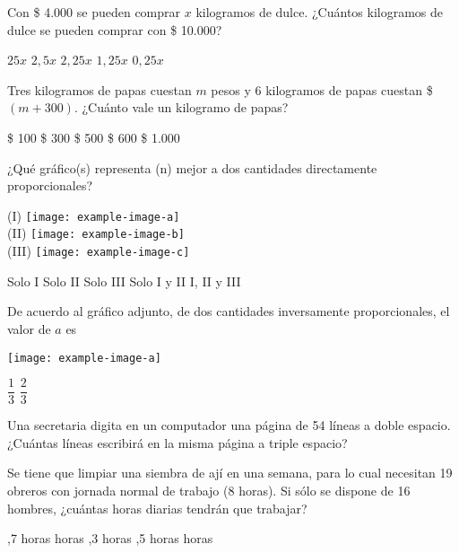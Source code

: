 \documentclass[pagina vacia]{srs}
\begin{document}
\begin{preguntas}
\pregunta Con \$ 4.000 se pueden comprar $x$ kilogramos de dulce. ¿Cuántos kilogramos de dulce se pueden comprar con \$ 10.000?
\begin{vertical}
\alternativa $25x$
\alternativa $2,5x$
\alternativa $2,25x$
\alternativa $1,25x$
\alternativa $0,25x$
\end{vertical}

\pregunta Tres kilogramos de papas cuestan $m$ pesos y 6 kilogramos de papas cuestan \$ $(m+300)$. ¿Cuánto vale un kilogramo de papas?
\begin{vertical}
\alternativa \$ 100
\alternativa \$ 300
\alternativa \$ 500
\alternativa \$ 600
\alternativa \$ 1.000
\end{vertical}

\pregunta ¿Qué gráfico(s) representa (n) mejor a dos cantidades directamente proporcionales?
\begin{centrado}
(I) \texttt{[image: example-image-a]} \\
(II) \texttt{[image: example-image-b]} \\
(III) \texttt{[image: example-image-c]}
\end{centrado}
\begin{vertical}
\alternativa Solo I
\alternativa Solo II
\alternativa Solo III
\alternativa Solo I y II
\alternativa I, II y III
\end{vertical}

\pregunta De acuerdo al gráfico adjunto, de dos cantidades inversamente proporcionales, el valor de $a$ es
\begin{centrado}
\texttt{[image: example-image-a]}
\end{centrado}
\begin{vertical}
\alternativa $\dfrac{1}{3}$
\alternativa $\dfrac{2}{3}$
\end{vertical}

\pregunta Una secretaria digita en un computador una página de 54 líneas a doble espacio. ¿Cuántas líneas escribirá en la misma página a triple espacio?
\begin{vertical}
\end{vertical}

\pregunta Se tiene que limpiar una siembra de ají en una semana, para lo cual necesitan 19 obreros con jornada normal de trabajo (8 horas). Si sólo se dispone de 16 hombres, ¿cuántas horas diarias tendrán que trabajar?
\begin{vertical}
,7 horas
 horas
,3 horas
,5 horas
 horas
\end{vertical}


\end{preguntas}
\end{document}
